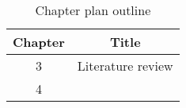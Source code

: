 \begin{table}[h!]
\centering
\begin{tabular}{cc}
{Chapter} & {Title} \\ \midrule
{3} & {Literature review} \\
{4}
\end{tabular}
\caption{Chapter plan outline}
\label{table:1}
\end{table}
